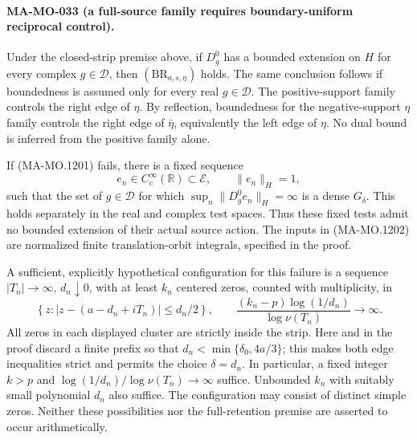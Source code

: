 \paragraph{MA-MO-033 (a full-source family requires boundary-uniform reciprocal control).}
Under the closed-strip premise above, if $D_g^0$ has a bounded
extension on $H$ for every complex $g\in\mathcal D$, then
$(\mathrm{BR}_{a,s,\eta})$ holds.  The same conclusion follows
if boundedness is assumed only for every real $g\in\mathcal D$.
The positive-support family controls the right edge of $\eta$.
By reflection, boundedness for the negative-support $\eta$ family
controls the right edge of $\bar\eta$, equivalently the left
edge of $\eta$.  No dual bound is inferred from the positive
family alone.

If (MA-MO.1201) fails, there is a fixed sequence
\[
 e_n\in C_c^\infty(\mathbb R)\subset\mathcal E,
           \qquad\|e_n\|_H=1,
 \tag{MA-MO.1202}
\]
such that the set of $g\in\mathcal D$ for which
$\sup_n\|D_g^0e_n\|_H=\infty$ is a dense $G_\delta$.
This holds separately in the real and complex test spaces.
Thus these fixed tests admit no bounded extension of their actual
source action.  The inputs in (MA-MO.1202) are normalized finite
translation-orbit integrals, specified in the proof.

A sufficient, explicitly hypothetical configuration for this failure
is a sequence $|T_n|\to\infty$, $d_n\downarrow0$, with at least
$k_n$ centered zeros, counted with multiplicity, in
\[
 \left\{z:\left|z-(a-d_n+iT_n)\right|\le d_n/2\right\},
 \qquad
 \frac{(k_n-p)\log(1/d_n)}{\log\nu(T_n)}\longrightarrow\infty.
 \tag{MA-MO.1203}
\]
All zeros in each displayed cluster are strictly inside the strip.
Here and in the proof discard a finite prefix so that
$d_n<\min\{\delta_0,4a/3\}$; this makes both edge inequalities
strict and permits the choice $\delta=d_n$.
In particular, a fixed integer $k>p$ and
$\log(1/d_n)/\log\nu(T_n)\to\infty$ suffice.
Unbounded $k_n$ with suitably small polynomial $d_n$ also suffice.
The configuration may consist of distinct simple zeros.  Neither
these possibilities nor the full-retention premise are asserted
to occur arithmetically.


